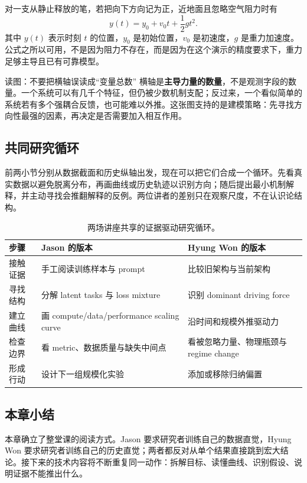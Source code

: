 
对一支从静止释放的笔，若把向下方向记为正，近地面且忽略空气阻力时有
\[
y(t)=y_0+v_0t+\frac{1}{2}gt^2.
\]
其中 $y(t)$ 表示时刻 $t$ 的位置，$y_0$ 是初始位置，$v_0$ 是初速度，$g$ 是重力加速度。公式之所以可用，不是因为阻力不存在，而是因为在这个演示的精度要求下，重力足够主导且已有可靠模型。



\begin{knowledgebox}{读图：不要把横轴误读成“变量总数”}
横轴是\textbf{主导力量的数量}，不是观测字段的数量。一个系统可以有几千个特征，但仍被少数机制支配；反过来，一个看似简单的系统若有多个强耦合反馈，也可能难以外推。这张图支持的是建模策略：先寻找方向性最强的因素，再决定是否需要加入相互作用。
\end{knowledgebox}

\subsection{共同研究循环}

前两小节分别从数据截面和历史纵轴出发，现在可以把它们合成一个循环。先看真实数据以避免脱离分布，再画曲线或历史轨迹以识别方向；随后提出最小机制解释，并主动寻找会推翻解释的反例。两位讲者的差别只在观察尺度，不在认识论结构。

\begin{table}[H]
\centering
\begin{tabularx}{\textwidth}{L{0.19\textwidth} >{\raggedright\arraybackslash}X >{\raggedright\arraybackslash}X}
\toprule
步骤 & Jason 的版本 & Hyung Won 的版本 \\
\midrule
接触证据 & 手工阅读训练样本与 prompt & 比较旧架构与当前架构 \\
寻找结构 & 分解 latent tasks 与 loss mixture & 识别 dominant driving force \\
建立曲线 & 画 compute/data/performance scaling curve & 沿时间和规模外推驱动力 \\
检查边界 & 看 metric、数据质量与缺失中间点 & 看被忽略力量、物理瓶颈与 regime change \\
形成行动 & 设计下一组规模化实验 & 添加或移除归纳偏置 \\
\bottomrule
\end{tabularx}
\caption{两场讲座共享的证据驱动研究循环。}
\end{table}

\subsection{本章小结}

本章确立了整堂课的阅读方式。Jason 要求研究者训练自己的数据直觉，Hyung Won 要求研究者训练自己的历史直觉；两者都反对从单个结果直接跳到宏大结论。接下来的技术内容将不断重复同一动作：拆解目标、读懂曲线、识别假设、说明证据不能推出什么。

